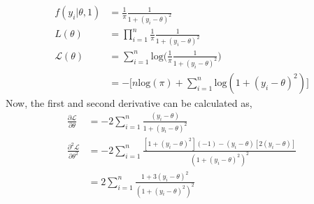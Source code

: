 \documentclass[11pt]{article}
\begin{document}
\begin{equation}
  \nonumber
  \begin{aligned}
    f(y_{i} | \theta, 1) & = \frac{1}{\pi} \frac{1}{1 + (y_{i} - \theta)^{2}}\\
    L(\theta) & =  \prod_{i = 1}^{n}\frac{1}{\pi} \frac{1}{1 + (y_{i} - \theta)^{2}}\\
    \mathcal{L}(\theta) & =  \sum_{i = 1}^{n} \text{log}\bigg(\frac{1}{\pi}\frac{1}{1 + (y_{i} - \theta)^{2}}\bigg)\\
    & = -\big[n\text{log}(\pi) + \sum_{i = 1}^{n} \text{log}(1 + (y_{i} - \theta)^{2}) \big]
  \end{aligned}
\end{equation}
Now, the first and second derivative can be calculated as,
\begin{equation}
  \nonumber
  \begin{aligned}
    \frac{\partial \mathcal{L}}{\partial \theta} & = -2 \sum_{i = 1}^{n}\frac{(y_{i} - \theta)}{1 + (y_{i} - \theta)^{2}}\\
    \frac{\partial^{2} \mathcal{L}}{\partial \theta^{2}} & = -2 \sum_{i = 1}^{n} \frac{[1 + (y_{i} - \theta)^{2}](-1) - (y_{i} - \theta)[2(y_{i} - \theta)]}{(1 + (y_{i} - \theta)^{2})^{2}}\\
    & = 2 \sum_{i = 1}^{n} \frac{1 + 3(y_{i} - \theta)^{2}}{(1 + (y_{i} - \theta)^{2})^{2}}
  \end{aligned}
\end{equation}
\end{document}
